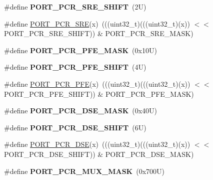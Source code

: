 \begin{DoxyCompactItemize}
\#define {\bfseries P\+O\+R\+T\+\_\+\+P\+C\+R\+\_\+\+S\+R\+E\+\_\+\+S\+H\+I\+FT}~(2\+U)
\item 
\#define \mbox{\hyperlink{group___p_o_r_t___register___masks_ga0b115d46762f17530e67c2caeeca89b7}{P\+O\+R\+T\+\_\+\+P\+C\+R\+\_\+\+S\+RE}}(x)~(((uint32\+\_\+t)(((uint32\+\_\+t)(x)) $<$$<$ P\+O\+R\+T\+\_\+\+P\+C\+R\+\_\+\+S\+R\+E\+\_\+\+S\+H\+I\+FT)) \& P\+O\+R\+T\+\_\+\+P\+C\+R\+\_\+\+S\+R\+E\+\_\+\+M\+A\+SK)
\item 
\mbox{\label{group___p_o_r_t___register___masks_ga7f1f5c3812018f9ed4d84a187146ba91}} 
\#define {\bfseries P\+O\+R\+T\+\_\+\+P\+C\+R\+\_\+\+P\+F\+E\+\_\+\+M\+A\+SK}~(0x10\+U)
\item 
\mbox{\label{group___p_o_r_t___register___masks_gae7d057ebd3218784fca57f55a85f2d29}} 
\#define {\bfseries P\+O\+R\+T\+\_\+\+P\+C\+R\+\_\+\+P\+F\+E\+\_\+\+S\+H\+I\+FT}~(4\+U)
\item 
\#define \mbox{\hyperlink{group___p_o_r_t___register___masks_ga6aaad9480435ab627b88723f45b5c133}{P\+O\+R\+T\+\_\+\+P\+C\+R\+\_\+\+P\+FE}}(x)~(((uint32\+\_\+t)(((uint32\+\_\+t)(x)) $<$$<$ P\+O\+R\+T\+\_\+\+P\+C\+R\+\_\+\+P\+F\+E\+\_\+\+S\+H\+I\+FT)) \& P\+O\+R\+T\+\_\+\+P\+C\+R\+\_\+\+P\+F\+E\+\_\+\+M\+A\+SK)
\item 
\mbox{\label{group___p_o_r_t___register___masks_gae1c37b9f66e58bd80e7764232fd05cee}} 
\#define {\bfseries P\+O\+R\+T\+\_\+\+P\+C\+R\+\_\+\+D\+S\+E\+\_\+\+M\+A\+SK}~(0x40\+U)
\item 
\mbox{\label{group___p_o_r_t___register___masks_ga00ae08038ade5432d0240666658d8867}} 
\#define {\bfseries P\+O\+R\+T\+\_\+\+P\+C\+R\+\_\+\+D\+S\+E\+\_\+\+S\+H\+I\+FT}~(6\+U)
\item 
\#define \mbox{\hyperlink{group___p_o_r_t___register___masks_ga991775ce627dd1e581bdaf4508239240}{P\+O\+R\+T\+\_\+\+P\+C\+R\+\_\+\+D\+SE}}(x)~(((uint32\+\_\+t)(((uint32\+\_\+t)(x)) $<$$<$ P\+O\+R\+T\+\_\+\+P\+C\+R\+\_\+\+D\+S\+E\+\_\+\+S\+H\+I\+FT)) \& P\+O\+R\+T\+\_\+\+P\+C\+R\+\_\+\+D\+S\+E\+\_\+\+M\+A\+SK)
\item 
\mbox{\label{group___p_o_r_t___register___masks_ga0feec5fc6b285b83c573f913c74e5c41}} 
\#define {\bfseries P\+O\+R\+T\+\_\+\+P\+C\+R\+\_\+\+M\+U\+X\+\_\+\+M\+A\+SK}~(0x700\+U)
$$
\end{DoxyCompactItemize}
